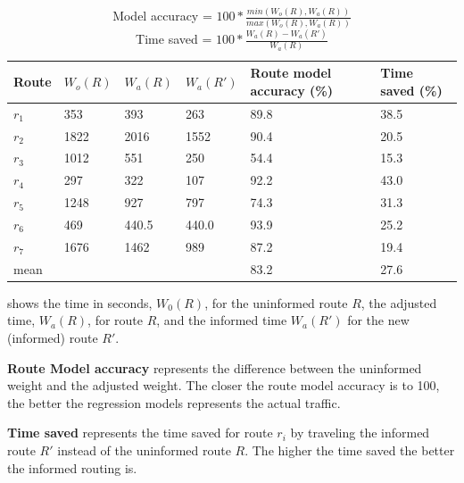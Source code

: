 \begin{table}[H]
\centering
\begin{tabular}{llllll}
\textbf{Route} & \textbf{$W_o(R)$} & \textbf{$W_a(R)$}  & \textbf{$W_a(R')$} & \textbf{Route model accuracy (\%)} & \textbf{Time saved (\%)} \\ \hline
$r_1$          & 353               & 393                & 263                & 89.8                         & 38.5 \\
$r_2$          & 1822              & 2016               & 1552               & 90.4                         & 20.5 \\
$r_3$          & 1012              & 551                & 250                & 54.4                         & 15.3 \\
$r_4$          & 297               & 322                & 107                & 92.2                         & 43.0 \\
$r_5$          & 1248              & 927                & 797                & 74.3                         & 31.3 \\
$r_6$          & 469               & 440.5              & 440.0              & 93.9                         & 25.2 \\
$r_7$          & 1676              & 1462               & 989                & 87.2                         & 19.4 \\ \hline
mean       	   &                   &                    &                    & 83.2                         & 27.6
\end{tabular}
\caption{Model accuracy = $100 * \frac{min(W_o(R), W_a(R))}{max(W_o(R), W_a(R))}$\\
	     Time saved = $100 * \frac{W_a(R) - W_a(R')}{W_a(R)}$}
\label{tab:eval-results}
\end{table}

 shows the time in seconds, $W_0(R)$, for the uninformed route $R$, the adjusted time, $W_a(R)$, for route $R$, and the informed time $W_a(R')$ for the new (informed) route $R'$.

\textbf{Route Model accuracy} represents the difference between the uninformed weight and the adjusted weight. The closer the route model accuracy is to 100, the better the regression models represents the actual traffic.

\textbf{Time saved} represents the time saved for route $r_i$ by traveling the informed route $R'$ instead of the uninformed route $R$. The higher the time saved the better the informed routing is.

